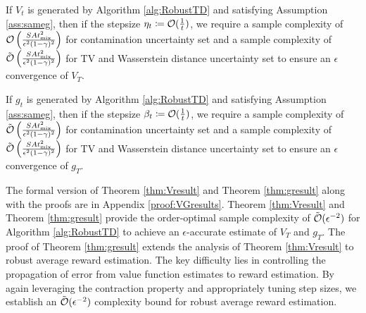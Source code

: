 \begin{theorem} \label{thm:Vresult}
   If $V_t$ is generated by Algorithm \ref{alg:RobustTD} and satisfying Assumption \ref{ass:sameg}, then if the stepsize $\eta_t \coloneqq \operatorname*{\mathcal{O}}(\frac{1}{t})$, we require a sample complexity of $\operatorname*{\mathcal{O}}\left(\frac{SAt^2_{\mathrm{mix}}}{\epsilon^2(1-\gamma)^2} \right)$ for contamination uncertainty set and a sample complexity of $\tilde{\operatorname*{\mathcal{O}}}\left(\frac{SAt^2_{\mathrm{mix}}}{\epsilon^2(1-\gamma)^2} \right)$ for TV and Wasserstein distance uncertainty set to ensure an $\epsilon$ convergence of $V_T$.
\end{theorem}
\begin{theorem} \label{thm:gresult}
    If $g_t$ is generated by Algorithm \ref{alg:RobustTD} and satisfying Assumption \ref{ass:sameg}, then if the stepsize $\beta_t \coloneqq \operatorname*{\mathcal{O}}(\frac{1}{t})$, we require a sample complexity of $\tilde{\operatorname*{\mathcal{O}}}\left(\frac{SAt^2_{\mathrm{mix}}}{\epsilon^2(1-\gamma)^2} \right)$ for contamination uncertainty set and a sample complexity of $\tilde{\operatorname*{\mathcal{O}}}\left(\frac{SAt^2_{\mathrm{mix}}}{\epsilon^2(1-\gamma)^2} \right)$ for TV and Wasserstein distance uncertainty set to ensure an $\epsilon$ convergence of $g_T$.
\end{theorem}

The formal version of Theorem \ref{thm:Vresult} and Theorem \ref{thm:gresult} along with the proofs are in Appendix \ref{proof:VGresults}. Theorem \ref{thm:Vresult} and Theorem \ref{thm:gresult} provide the order-optimal sample complexity 
of $\tilde{\operatorname*{\mathcal{O}}}(\epsilon^{-2})$ for Algorithm \ref{alg:RobustTD} to achieve an $\epsilon$-accurate estimate of $V_T$ and $g_T$. The proof of Theorem \ref{thm:gresult} extends the analysis of Theorem \ref{thm:Vresult} to robust average reward estimation. The key difficulty lies in controlling the propagation of error from value function estimates to reward estimation. By again leveraging the contraction property and appropriately tuning step sizes, we establish an $\tilde{\operatorname*{\mathcal{O}}}(\epsilon^{-2})$ complexity bound for robust average reward estimation.

